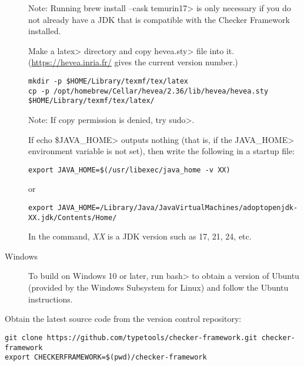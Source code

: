 \begin{description}
Note: Running \<brew install --cask temurin17> is only necessary if you do not
already have a JDK that is compatible with the Checker Framework installed.

Make a \<latex> directory and copy \<hevea.sty> file into it.
(\url{https://hevea.inria.fr/} gives the current version number.)

\begin{Verbatim}
mkdir -p $HOME/Library/texmf/tex/latex
cp -p /opt/homebrew/Cellar/hevea/2.36/lib/hevea/hevea.sty $HOME/Library/texmf/tex/latex/
\end{Verbatim}

Note: If copy permission is denied, try \<sudo>.

If \<echo \$JAVA\_HOME> outputs nothing (that is, if the \<JAVA\_HOME>
environment variable is not set), then write the following
in a startup file:

\begin{Verbatim}
export JAVA_HOME=$(/usr/libexec/java_home -v XX)
\end{Verbatim}
or
\begin{Verbatim}
export JAVA_HOME=/Library/Java/JavaVirtualMachines/adoptopenjdk-XX.jdk/Contents/Home/
\end{Verbatim}

In the command, \emph{XX} is a JDK version such as 17, 21, 24, etc.

\item[Windows]
  To build on Windows 10 or later,
  run \<bash> to obtain a version of
  Ubuntu (provided by the Windows Subsystem for Linux) and follow the Ubuntu
  instructions.


\end{description}



Obtain the latest source code from the version control repository:

\begin{Verbatim}
git clone https://github.com/typetools/checker-framework.git checker-framework
export CHECKERFRAMEWORK=$(pwd)/checker-framework
\end{Verbatim}

